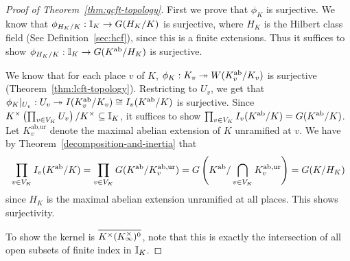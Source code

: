 \begin{proof}[Proof of Theorem~\ref{thm:gcft-topology}]
%
First we prove that $\phi_K$ is surjective. We know that $\phi_{H_K/K}:\mathbb{I}_K\to G(H_K/K)$ is surjective, where $H_K$ is the Hilbert class field (See Definition~\ref{sec:hcf}), since this is a finite extensions. Thus it suffices to show $\phi_{H_K/K}:\mathbb{I}_K\to G(K^{\text{ab}}/H_K)$ is surjective.

We know that for each place $v$ of $K$, $\phi_K:K_v\twoheadrightarrow W(K_v^{\text{ab}}/K_v)$ is surjective (Theorem~\ref{thm:lcft-topology}). Restricting to $U_v$, we get that $\phi_K|_{U_v}:U_v\twoheadrightarrow I(K_v^{\text{ab}}/K_v)\cong I_v(K^{\text{ab}}/K)$ is surjective. %
Since $K^{\times}\left( {\prod_{v\in V_K} U_v} \right)/K^{\times}\subseteq \mathbb{I}_K$, it suffices to show $\prod_{v\in V_K} I_v(K^{\text{ab}}/K)=G(K^{\text{ab}}/K)$. Let $K^{\text{ab,ur}}_v$ denote the maximal abelian extension of $K$ unramified at $v$. We have by Theorem~\ref{decomposition-and-inertia} that
\[
\prod_{v\in V_K} I_v(K^{\text{ab}}/K)=\prod_{v\in V_K} G(K^{\text{ab}}/K^{\text{ab,ur}}_v)=G\left( {K^{\text{ab}}/\bigcap_{v\in V_K} K^{\text{ab,ur}}_v} \right)=G(K/H_K)
\]
since $H_K$ is the maximal abelian extension unramified at all places. This shows surjectivity.

To show the kernel is $\overline{K^{\times}(K^{\times}_{\infty})^0}$, note that this is exactly the intersection of all open subsets of finite index in $\mathbb{I}_K$. 
\end{proof}
